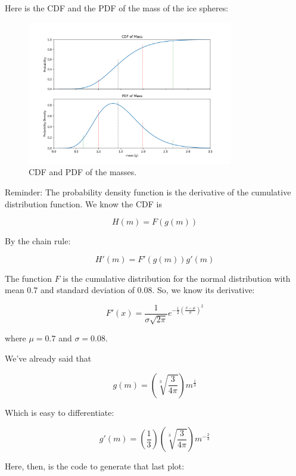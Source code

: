 Here is the CDF and the PDF of the mass of the ice spheres:
\begin{figure}[htbp]
    \centering
    \includegraphics[width=0.8\textwidth]{pdf.png}
    \caption{CDF and PDF of the masses.}
    \label{fig:cdf_pdf_mass}
\end{figure}

Reminder: The probability density function is the derivative of the cumulative distribution function.  We know the CDF is

$$H(m) = F(g(m))$$

By the chain rule:

$$H'(m) = F'(g(m))g'(m)$$

The function $F$ is the cumulative distribution for the normal distribution with mean $0.7$ and standard deviation of $0.08$. So, we know its derivative:

$$F'(x) = \frac{1}{\sigma\sqrt{2\pi}} e^{-\frac{1}{2}\left(\frac{x - \mu}{\sigma}\right)^2}$$

where $\mu = 0.7$ and $\sigma = 0.08$.

We've already said that 

$$g(m) = \left(\sqrt[3]{\frac{3}{4 \pi}}\right) m^{\frac{1}{3}}$$

Which is easy to differentiate:

$$g'(m) = \left(\frac{1}{3} \right) \left(\sqrt[3]{\frac{3}{4 \pi}}\right) m^{-\frac{2}{3}}$$

Here, then, is the code to generate that last plot:

